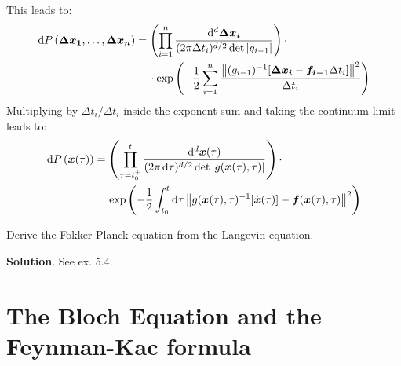 \documentclass[../template.tex]{subfiles}
\begin{document}
\begin{exo}
    This leads to:
    \begin{align*}
        \dd{P}(\bm{\Delta x_1}, \dots,\bm{\Delta x_n}) &= \left(\prod_{i=1}^n \frac{\dd[d]{ \bm{\Delta x_i}}}{(2 \pi \Delta t_i)^{d/2} \operatorname{det}|g_{i-1}| }   \right) \cdot\\
        &\quad \> \cdot \exp\left(-\frac{1}{2} \sum_{i=1}^n \frac{\norm{(g_{i-1})^{-1} [ \bm{\Delta x_i} - \bm{f_{i-1}}\Delta t_i]}^2 }{\Delta t_i}  \right)
    \end{align*}
    Multiplying by $\Delta t_i / \Delta t_i$ inside the exponent sum and taking the continuum limit leads to:
    \begin{align*}
        \dd{P}(\bm{x}(\tau)) &= \left(\prod_{\tau=t_0^+}^t \frac{\dd[d]{\bm{x}(\tau)}}{(2 \pi \dd{\tau} )^{d/2} \operatorname{det}|g(\bm{x}(\tau), \tau)| } \right) \cdot \\
        &\quad \> \exp\left(-\frac{1}{2} \int_{t_0}^t \dd{\tau} \norm{g(\bm{x}(\tau), \tau)^{-1} [\dot{\bm{x}}(\tau)] - {\bm{f}(\bm{x}(\tau), \tau)} }^2 \right)
    \end{align*}
\end{exo}

\begin{exo}
    Derive the Fokker-Planck equation from the Langevin equation.
    \medskip

    \textbf{Solution}. See ex. 5.4. %
\end{exo}


\chapter{The Bloch Equation and the Feynman-Kac formula}
\begin{exo}
    
\end{exo}

\listoftheorems
\end{document}
